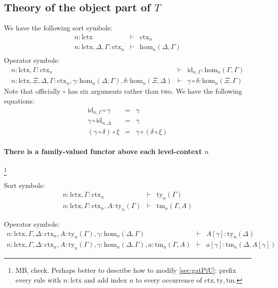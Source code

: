 \documentclass[11pt,a4paper]{article}
\theoremstyle{definition}
\newcommand{\id}{\mathsf{id}}
\def\Hom{\mathrm{hom}}
\def\id{\mathrm{id}}
\def\lctx{\mathrm{lctx}}
\newcommand{\ctx}{\mathrm{ctx}}
\newcommand{\ty}{\mathrm{ty}}
\newcommand{\tm}{\mathrm{tm}}
\begin{document}
\subsection{Theory of the object part of $T$}
We have the following sort symbols:
\begin{eqnarray*}
n : \lctx &\vdash& \ctx_n\\
n : \lctx, \Delta, \Gamma : \ctx_n &\vdash& \Hom_n(\Delta,\Gamma)\\
\end{eqnarray*}
Operator symbols:
\begin{eqnarray*}
n : \lctx, \Gamma : \ctx_n &\vdash& \id_{n,\Gamma} : \Hom_n(\Gamma,\Gamma)\\
n : \lctx, \Xi,\Delta,\Gamma : \ctx_n, \gamma : \Hom_n(\Delta,\Gamma), \delta : \Hom_n(\Xi,\Delta) &\vdash&
\gamma \circ \delta : \Hom_n(\Xi,\Gamma)
\end{eqnarray*}
Note that officially $\circ$ has six arguments rather than two.
We have the following equations:
\begin{eqnarray*}
\id_{n,\Gamma} \circ \gamma &=& \gamma \\
 \gamma \circ \id_{n,\Delta} &=& \gamma \\
(\gamma \circ \delta) \circ \xi &=& \gamma \circ (\delta \circ \xi)
\end{eqnarray*}


\paragraph{There is a family-valued functor above each level-context $n$}

\footnote{MB, check. Perhaps better to describe how to modify \ref{sec:gatPiU}:
prefix every rule with $n:\lctx$ and add index $n$ to every occurrence
of $\ctx,\ty,\tm$.}

Sort symbols:
\begin{eqnarray*}
n : \lctx, \Gamma : \ctx_n &\vdash& \ty_n(\Gamma)\\
n : \lctx, \Gamma : \ctx_n, A:\ty_n(\Gamma) &\vdash& \tm_n(\Gamma,A)
\end{eqnarray*}

Operator symbols:
\begin{eqnarray*}
n : \lctx, \Gamma,\Delta : \ctx_n, A:\ty_n(\Gamma), \gamma : \Hom_n(\Delta,\Gamma) &\vdash&
A[\gamma] : \ty_n(\Delta)\\
n : \lctx, \Gamma,\Delta : \ctx_n, A:\ty_n(\Gamma), \gamma : \Hom_n(\Delta,\Gamma), a:\tm_n(\Gamma,A) &\vdash&  a[\gamma] : \tm_n(\Delta,A[\gamma])
\end{eqnarray*}
\end{document}
